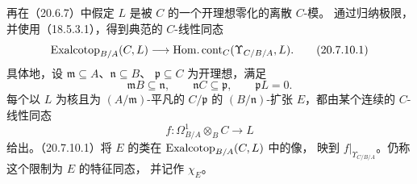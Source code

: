 再在（20.6.7）中假定 $L$ 是被 $C$ 的一个开理想零化的离散 $C$-模。
通过归纳极限，并使用（18.5.3.1），得到典范的 $C$-线性同态
\begin{equation}
 \operatorname{Exalcotop}_{B/A}(C,L)\longrightarrow
 \operatorname{Hom.cont}_C(\Upsilon_{C/B/A},L).
 \tag{20.7.10.1}
\end{equation}
具体地，设 $\mathfrak m\subseteq A$、$\mathfrak n\subseteq B$、
$\mathfrak p\subseteq C$ 为开理想，满足
\[
 \mathfrak mB\subseteq\mathfrak n,\qquad
 \mathfrak nC\subseteq\mathfrak p,\qquad \mathfrak pL=0 .
\]
每个以 $L$ 为核且为 $(A/\mathfrak m)$-平凡的 $C/\mathfrak p$ 的
$(B/\mathfrak n)$-扩张 $E$，都由某个连续的 $C$-线性同态
\[
 f:\Omega^1_{B/A}\otimes_B C\longrightarrow L
\]
给出。（20.7.10.1）将 $E$ 的类在 $\operatorname{Exalcotop}_{B/A}(C,L)$ 中的像，
映到 $f|_{\Upsilon_{C/B/A}}$。仍称这个限制为 $E$ 的特征同态，
并记作 $\chi_E$。
